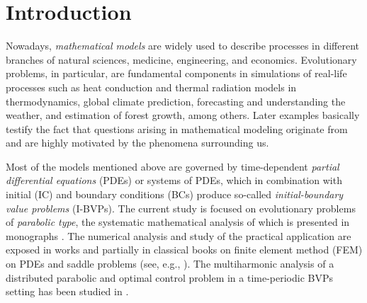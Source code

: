 \chapter{Introduction}

Nowadays, {\em mathematical models} are widely used to describe processes in 
different branches of natural sciences, medicine, engineering, and economics. 
Evolutionary problems, in particular, are fundamental components in simulations of 
real-life processes such as heat conduction and thermal radiation models in 
thermodynamics, global climate prediction, forecasting and understanding the 
weather, and estimation of forest growth, among others. Later examples basically 
testify the fact
that questions arising in mathematical modeling originate from and are 
highly motivated 
by the phenomena surrounding us.

Most of the models mentioned above are governed by time-dependent {\em partial 
differential equations} (PDEs) or systems of PDEs, which in combination with initial 
(IC) and boundary conditions (BCs) produce so-called {\em initial-boundary value 
problems} (I-BVPs). 
The current study is focused on evolutionary problems of {\em parabolic type}, the 
systematic mathematical analysis of which is presented in monographs 
\cite{Ladyzhenskaya1985, Ladyzhenskayaetall1967, Wloka1987, Zeidler1990A,Zeidler1990B}.
The numerical analysis and study of the practical application are exposed in works 
\cite{Thomee2006,Lang2001} and partially in classical books on finite element method 
(FEM) on PDEs and saddle problems (see, e.g., \cite{Braess2001,GrossmannRoosStynes2007,
Johnson2009,Glowinski1984,Glowinskietall1976}). 
The multiharmonic analysis of a distributed parabolic and optimal control problem 
in a time-periodic BVPs setting has been studied in
\cite{KollmannKolmbauerLangerWolfmayrZulehner2013,LangerWolfmayr2013}.


